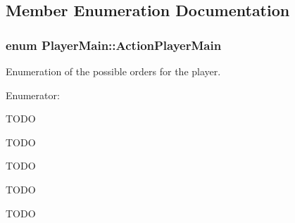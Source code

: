 \subsection{Member Enumeration Documentation}
\hypertarget{classPlayerMain_af07f952a547b2902a452c1413f26dae2}{
\subsubsection[{ActionPlayerMain}]{\setlength{\rightskip}{0pt plus 5cm}enum {\bf PlayerMain::ActionPlayerMain}}}
\label{classPlayerMain_af07f952a547b2902a452c1413f26dae2}


Enumeration of the possible orders for the player. 

\begin{Desc}
\item[Enumerator: ]\par
\begin{description}
\item[{\em 
\hypertarget{classPlayerMain_af07f952a547b2902a452c1413f26dae2ad110267c0dfd47655250b6e11cb333ed}{
GO\_\-TO\_\-DEF\_\-POS}
\label{classPlayerMain_af07f952a547b2902a452c1413f26dae2ad110267c0dfd47655250b6e11cb333ed}
}]TODO \item[{\em 
\hypertarget{classPlayerMain_af07f952a547b2902a452c1413f26dae2a3bfe9a85c58f83e457c2515fab072d03}{
KICK\_\-PENALTY}
\label{classPlayerMain_af07f952a547b2902a452c1413f26dae2a3bfe9a85c58f83e457c2515fab072d03}
}]TODO \item[{\em 
\hypertarget{classPlayerMain_af07f952a547b2902a452c1413f26dae2aa3a0ef85cf87cfe01eb07e7d72e959cd}{
KICK\_\-OFF}
\label{classPlayerMain_af07f952a547b2902a452c1413f26dae2aa3a0ef85cf87cfe01eb07e7d72e959cd}
}]TODO \item[{\em 
\hypertarget{classPlayerMain_af07f952a547b2902a452c1413f26dae2a182faa57b0ea5f67cd916a9261df12dc}{
STOP}
\label{classPlayerMain_af07f952a547b2902a452c1413f26dae2a182faa57b0ea5f67cd916a9261df12dc}
}]TODO \item[{\em 
\hypertarget{classPlayerMain_af07f952a547b2902a452c1413f26dae2a19eca8a0a0720f6c698f344b4e6ffb72}{
FOLLOWPATH}
\label{classPlayerMain_af07f952a547b2902a452c1413f26dae2a19eca8a0a0720f6c698f344b4e6ffb72}
}]TODO \end{description}
\end{Desc}



